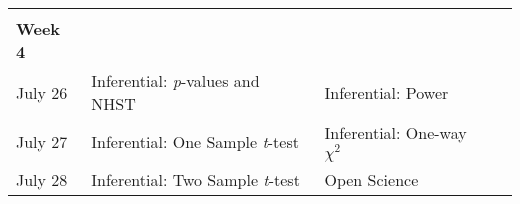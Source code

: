 \documentclass[
]{book}
\begin{document}
\begin{longtable}[]{@{}llll@{}}
\begin{minipage}[t]{0.18\columnwidth}
\strut
\end{minipage}\tabularnewline
\begin{minipage}[t]{0.09\columnwidth}\raggedright
\textbf{Week 4}\strut
\end{minipage} & \begin{minipage}[t]{0.32\columnwidth}\raggedright
\strut
\end{minipage} & \begin{minipage}[t]{0.29\columnwidth}\raggedright
\strut
\end{minipage} & \begin{minipage}[t]{0.18\columnwidth}\raggedright
\strut
\end{minipage}\tabularnewline
\begin{minipage}[t]{0.09\columnwidth}\raggedright
July 26\strut
\end{minipage} & \begin{minipage}[t]{0.32\columnwidth}\raggedright
Inferential: \emph{p}-values and NHST\strut
\end{minipage} & \begin{minipage}[t]{0.29\columnwidth}\raggedright
Inferential: Power\strut
\end{minipage} & \begin{minipage}[t]{0.18\columnwidth}\raggedright
\strut
\end{minipage}\tabularnewline
\begin{minipage}[t]{0.09\columnwidth}\raggedright
July 27\strut
\end{minipage} & \begin{minipage}[t]{0.32\columnwidth}\raggedright
Inferential: One Sample \emph{t}-test\strut
\end{minipage} & \begin{minipage}[t]{0.29\columnwidth}\raggedright
Inferential: One-way \(\chi^2\)\strut
\end{minipage} & \begin{minipage}[t]{0.18\columnwidth}\raggedright
\strut
\end{minipage}\tabularnewline
\begin{minipage}[t]{0.09\columnwidth}\raggedright
July 28\strut
\end{minipage} & \begin{minipage}[t]{0.32\columnwidth}\raggedright
Inferential: Two Sample \emph{t}-test\strut
\end{minipage} & \begin{minipage}[t]{0.29\columnwidth}\raggedright
Open Science\strut
\end{minipage} & \begin{minipage}[t]{0.18\columnwidth}\raggedright

\end{minipage}
\end{longtable}
\end{document}
